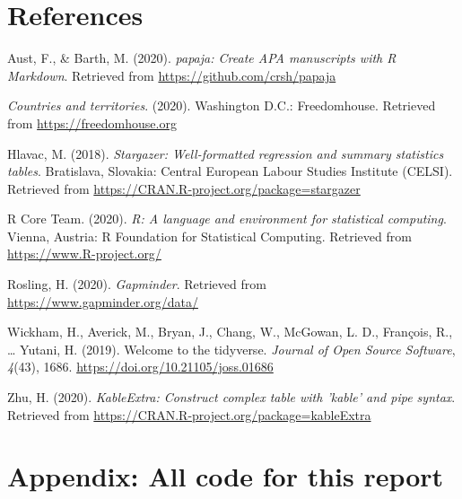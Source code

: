 \documentclass[
  english,
  man,floatsintext]{apa6}
\newlength{\cslhangindent}
\newenvironment{cslreferences}%
  {\setlength{\parindent}{0pt}%
  \everypar{\setlength{\hangindent}{\cslhangindent}}\ignorespaces}%
  {\par}
\begin{document}
\newpage

\hypertarget{references}{%
\section{References}\label{references}}

\begingroup
\setlength{\parindent}{-0.5in}
\setlength{\leftskip}{0.5in}

\hypertarget{refs}{}
\begin{cslreferences}
\leavevmode\hypertarget{ref-R-papaja}{}%
Aust, F., \& Barth, M. (2020). \emph{papaja: Create APA manuscripts with R Markdown}. Retrieved from \url{https://github.com/crsh/papaja}

\leavevmode\hypertarget{ref-Freedomhouse}{}%
\emph{Countries and territories}. (2020). Washington D.C.: Freedomhouse. Retrieved from \url{https://freedomhouse.org}

\leavevmode\hypertarget{ref-R-stargazer}{}%
Hlavac, M. (2018). \emph{Stargazer: Well-formatted regression and summary statistics tables}. Bratislava, Slovakia: Central European Labour Studies Institute (CELSI). Retrieved from \url{https://CRAN.R-project.org/package=stargazer}

\leavevmode\hypertarget{ref-R-base}{}%
R Core Team. (2020). \emph{R: A language and environment for statistical computing}. Vienna, Austria: R Foundation for Statistical Computing. Retrieved from \url{https://www.R-project.org/}

\leavevmode\hypertarget{ref-Gapminder}{}%
Rosling, H. (2020). \emph{Gapminder}. Retrieved from \url{https://www.gapminder.org/data/}

\leavevmode\hypertarget{ref-R-tidyverse}{}%
Wickham, H., Averick, M., Bryan, J., Chang, W., McGowan, L. D., François, R., \ldots{} Yutani, H. (2019). Welcome to the tidyverse. \emph{Journal of Open Source Software}, \emph{4}(43), 1686. \url{https://doi.org/10.21105/joss.01686}

\leavevmode\hypertarget{ref-R-kableExtra}{}%
Zhu, H. (2020). \emph{KableExtra: Construct complex table with 'kable' and pipe syntax}. Retrieved from \url{https://CRAN.R-project.org/package=kableExtra}
\end{cslreferences}

\endgroup

\newpage

\hypertarget{appendix-all-code-for-this-report}{%
\section{Appendix: All code for this report}\label{appendix-all-code-for-this-report}}
\end{document}
